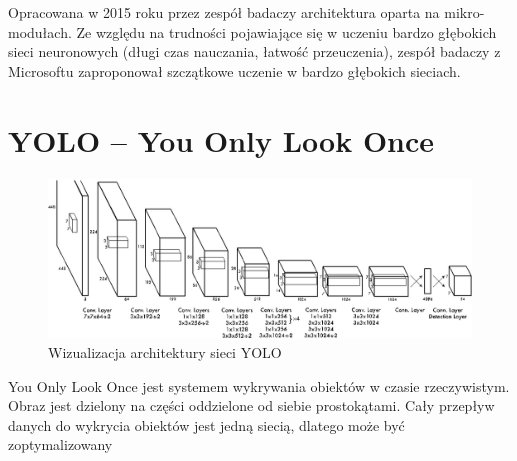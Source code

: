 \documentclass[12pt,a4paper,twoside,titlepage,openright]{book}
\begin{document}
\begin{itemize}
Opracowana w 2015 roku przez zespół badaczy architektura oparta na mikro-modułach. Ze względu na trudności pojawiające się w uczeniu bardzo głębokich sieci neuronowych (długi czas nauczania, łatwość przeuczenia), zespół badaczy z Microsoftu zaproponował szczątkowe uczenie w bardzo głębokich sieciach. \cite{DBLP:journals/corr/HeZRS15}




\section{YOLO -- You Only Look Once}
\begin{figure}[ht]
	\centering
			\includegraphics[resolution=100, scale=0.5]{YOLO.png}
		\caption{Wizualizacja architektury sieci YOLO}
\end{figure}

You Only Look Once jest systemem wykrywania obiektów w czasie rzeczywistym. Obraz jest dzielony na części oddzielone od siebie prostokątami.
Cały przepływ danych do wykrycia obiektów jest jedną siecią, dlatego może być zoptymalizowany \cite{DBLP:journals/corr/RedmonDGF15}



\end{itemize}
\end{document}
